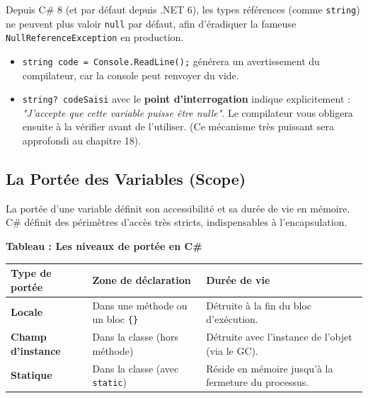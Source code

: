 \begin{tcolorbox}[colback=backcolour,colframe=keywordcolor,title=\textbf{Note sur \texttt{string?} et les \textit{Nullable Reference Types}}]
Depuis C\# 8 (et par défaut depuis .NET 6), les types références (comme \texttt{string}) ne peuvent plus valoir \texttt{null} par défaut, afin d'éradiquer la fameuse \texttt{NullReferenceException} en production.
\begin{itemize}
    \item \texttt{string code = Console.ReadLine();} générera un avertissement du compilateur, car la console peut renvoyer du vide.
    \item \texttt{string? codeSaisi} avec le \textbf{point d'interrogation} indique explicitement : \textit{"J'accepte que cette variable puisse être nulle"}. Le compilateur vous obligera ensuite à la vérifier avant de l'utiliser. (Ce mécanisme très puissant sera approfondi au chapitre 18).
\end{itemize}
\end{tcolorbox}

\subsection{La Portée des Variables (Scope)}

La portée d'une variable définit son accessibilité et sa durée de vie en mémoire. C\# définit des périmètres d'accès très stricts, indispensables à l'encapsulation.

\begin{center}
    \textbf{Tableau : Les niveaux de portée en C\#} \\[0.3cm]
    \begin{tabular}{@{}lp{5cm}p{5.5cm}@{}}
        \toprule
        \textbf{Type de portée} & \textbf{Zone de déclaration} & \textbf{Durée de vie} \\
        \midrule
        \textbf{Locale} & Dans une méthode ou un bloc \texttt{\{\}} & Détruite à la fin du bloc d'exécution. \\
        \textbf{Champ d'instance} & Dans la classe (hors méthode) & Détruite avec l'instance de l'objet (via le GC). \\
        \textbf{Statique} & Dans la classe (avec \texttt{static}) & Réside en mémoire jusqu'à la fermeture du processus. \\
        \bottomrule
    \end{tabular}
\end{center}

